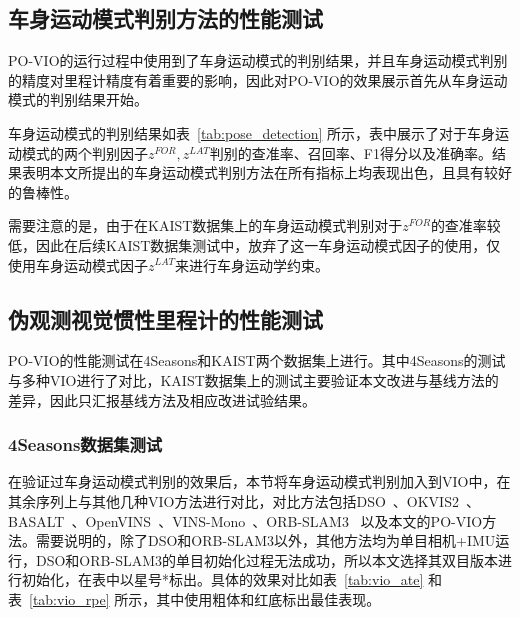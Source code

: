 \subsection{车身运动模式判别方法的性能测试}
PO-VIO的运行过程中使用到了车身运动模式的判别结果，并且车身运动模式判别的精度对里程计精度有着重要的影响，因此对PO-VIO的效果展示首先从车身运动模式的判别结果开始。

车身运动模式的判别结果如表~\ref{tab:pose_detection} 所示，表中展示了对于车身运动模式的两个判别因子$z^{FOR},z^{LAT}$判别的查准率、召回率、F1得分以及准确率。结果表明本文所提出的车身运动模式判别方法在所有指标上均表现出色，且具有较好的鲁棒性。

\begin{table}
\centering
\caption{车身运动模式判别网络性能测试}
\label{tab:pose_detection}
\end{table}

需要注意的是，由于在KAIST数据集上的车身运动模式判别对于$z^{FOR}$的查准率较低，因此在后续KAIST数据集测试中，放弃了这一车身运动模式因子的使用，仅使用车身运动模式因子$z^{LAT}$来进行车身运动学约束。

\subsection{伪观测视觉惯性里程计的性能测试}

PO-VIO的性能测试在4Seasons和KAIST两个数据集上进行。其中4Seasons的测试与多种VIO进行了对比，KAIST数据集上的测试主要验证本文改进与基线方法的差异，因此只汇报基线方法及相应改进试验结果。
\subsubsection{4Seasons数据集测试}
在验证过车身运动模式判别的效果后，本节将车身运动模式判别加入到VIO中，在其余序列上与其他几种VIO方法进行对比，对比方法包括DSO~\cite{von2018direct}、OKVIS2~\cite{leutenegger2022okvis2}、BASALT~\cite{usenko2019visual}、OpenVINS~\cite{Geneva2020ICRA}、VINS-Mono~\cite{qin2018vins}、ORB-SLAM3~\cite{campos2021orb} 以及本文的PO-VIO方法。需要说明的，除了DSO和ORB-SLAM3以外，其他方法均为单目相机+IMU运行，DSO和ORB-SLAM3的单目初始化过程无法成功，所以本文选择其双目版本进行初始化，在表中以星号*标出。具体的效果对比如表~\ref{tab:vio_ate} 和表~\ref{tab:vio_rpe} 所示，其中使用粗体和红底标出最佳表现。

